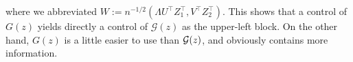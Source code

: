  where we abbreviated $W:=n^{-1/2}(\Lambda U^\top Z_1^\top, V^\top Z_2^\top)$. This shows that a control of $G(z)$ yields directly a control of $\mathcal G(z)$ as the upper-left block. On the other hand, $G(z)$ is a little  easier to use than $\cal G(z)$, and obviously contains more information. 



